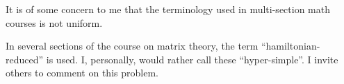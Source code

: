 \documentclass{sample}
\begin{document}
It is of some concern to me   that 
the terminology used in  multi-section
 math courses is not uniform.

In several sections of the course on 
matrix theory, the  term   
 ``hamiltonian-reduced'' is used. 
 I, personally, would rather call these 
``hyper-simple''. I invite others 
 to comment on this  problem.
\end{document}
